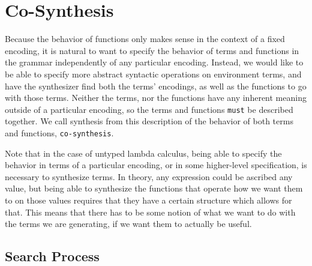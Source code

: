 \section{Co-Synthesis}
Because the behavior of functions only makes sense in the context of a
  fixed encoding, it is natural to want to specify the behavior of
  terms and functions in the grammar independently of any particular
  encoding.
Instead, we would like to be able to specify more abstract syntactic
  operations on environment terms, and have the synthesizer find both
  the terms' encodings, as well as the functions to go with those terms.
Neither the terms, nor the functions have any inherent meaning outside
  of a particular encoding, so the terms and functions \texttt{must} be
  described together.
We call synthesis from this description of the behavior of both terms
  and functions, \texttt{co-synthesis}.

Note that in the case of untyped lambda calculus, being able to specify
  the behavior in terms of a particular encoding, or in some higher-level
  specification, is necessary to synthesize terms.
In theory, any expression could be ascribed any value, but being able to
  synthesize the functions that operate how we want them to on those values
  requires that they have a certain structure which allows for that.
This means that there has to be some notion of what we want to do with
  the terms we are generating, if we want them to actually be useful.

\subsection{Search Process}
